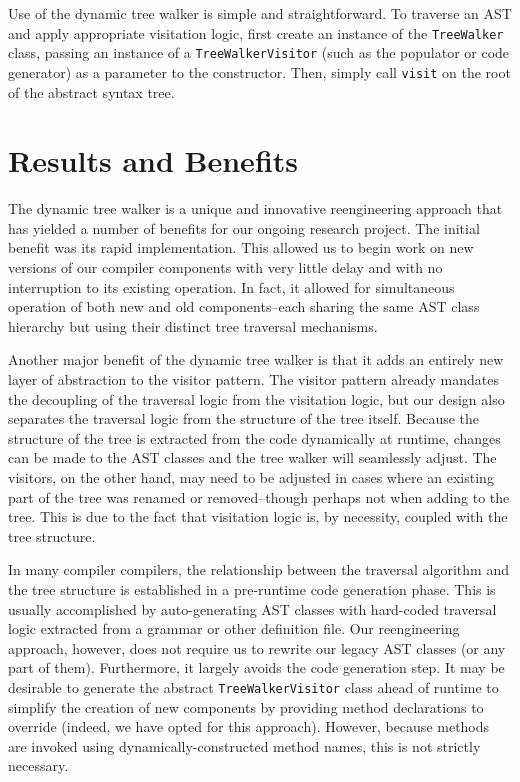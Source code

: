 \documentclass[times]{speauth}
\begin{document}
Use of the dynamic tree walker is simple and straightforward. To traverse an AST and apply appropriate visitation logic, first create an instance of the \texttt{TreeWalker} class, passing an instance of a \texttt{TreeWalkerVisitor} (such as the populator or code generator) as a parameter to the constructor. Then, simply call \texttt{visit} on the root of the abstract syntax tree.


\section{Results and Benefits}

The dynamic tree walker is a unique and innovative reengineering approach that has yielded a number of benefits for our ongoing research project. The initial benefit was its rapid implementation. This allowed us to begin work on new versions of our compiler components with very little delay and with no interruption to its existing operation. In fact, it allowed for simultaneous operation of both new and old components--each sharing the same AST class hierarchy but using their distinct tree traversal mechanisms.

Another major benefit of the dynamic tree walker is that it adds an entirely new layer of abstraction to the visitor pattern. The visitor pattern already mandates the decoupling of the traversal logic from the visitation logic, but our design also separates the traversal logic from the structure of the tree itself. Because the structure of the tree is extracted from the code dynamically at runtime, changes can be made to the AST classes and the tree walker will seamlessly adjust. The visitors, on the other hand, may need to be adjusted in cases where an existing part of the tree was renamed or removed--though perhaps not when adding to the tree. This is due to the fact that visitation logic is, by necessity, coupled with the tree structure.

In many compiler compilers, the relationship between the traversal algorithm and the tree structure is established in a pre-runtime code generation phase. This is usually accomplished by auto-generating AST classes with hard-coded traversal logic extracted from a grammar or other definition file. Our reengineering approach, however, does not require us to rewrite our legacy AST classes (or any part of them). Furthermore, it largely avoids the code generation step. It may be desirable to generate the abstract \texttt{TreeWalkerVisitor} class ahead of runtime to simplify the creation of new components by providing method declarations to override (indeed, we have opted for this approach). However, because methods are invoked using dynamically-constructed method names, this is not strictly necessary.
\end{document}
